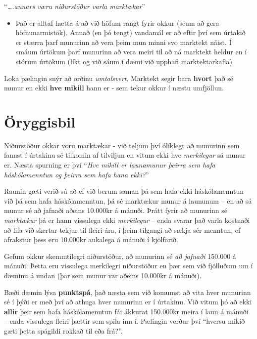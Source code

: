 \documentclass[
]{book}
\providecommand{\tightlist}{%
  \setlength{\itemsep}{0pt}\setlength{\parskip}{0pt}}
\begin{document}
``\emph{\ldots.annars væru niðurstöður varla marktækar}''

\begin{itemize}
\tightlist
\item
  Það er alltaf hætta á að við höfum rangt fyrir okkur (séum að gera höfnunarmistök). Annað (en þó tengt) vandamál er að eftir því sem úrtakið er stærra þarf munurinn að vera þeim mun minni svo marktekt náist. Í smáum úrtökum þarf munurinn að vera meiri til að ná marktekt heldur en í stórum úrtökum (líkt og við sáum í dæmi við upphafi marktektarkafla)
\end{itemize}

Loka pælingin snýr að orðinu \emph{umtalsvert}. Marktekt segir bara \textbf{hvort} það sé munur en ekki \textbf{hve mikill} hann er - sem tekur okkur í næstu umfjöllun.

\hypertarget{uxf6ryggisbil}{%
\chapter{Öryggisbil}\label{uxf6ryggisbil}}

Niðurstöður okkar voru marktækar - við teljum því ólíklegt að munurinn sem fannst í úrtakinu sé tilkomin af tilviljun en vitum ekki hve \emph{merkilegur} sá munur er. Næsta spurning er því ``\emph{Hve mikill er launamunur þeirra sem hafa háskólamenntun og þeirra sem hafa hana ekki?}''

Raunin gæti verið sú að ef við berum saman þá sem hafa ekki háskólamenntun við þá sem hafa háskólamenntun, þá sé marktækur munur á laununum -- en að sá munur sé að jafnaði aðeins 10.000kr á mánuði. Þrátt fyrir að munurinn sé \emph{marktækur} þá er hann vissulega ekki \emph{merkilegur} -- enda svarar það varla kostnaði að lifa við skertar tekjur til fleiri ára, í þeim tilgangi að sækja sér menntun, ef afrakstur þess eru 10.000kr aukalega á mánuði í kjölfarið.

Gefum okkur skemmtilegri niðurstöður, að munurinn sé \emph{að jafnaði} 150.000 á mánuði. Þetta eru vissulega merkilegri niðurstöður en þær sem við fjölluðum um í dæminu á undan (þar sem munur var aðeins 10.000kr á mánuði).

Bæði dæmin lýsa \textbf{punktspá}, það næsta sem við komumst að vita hver munurinn sé í þýði er með því að athuga hver munurinn er í úrtakinu. Við vitum þó að ekki \textbf{allir} þeir sem hafa háskólamenntun fái ákkurat 150.000kr meira í laun á mánuði -- enda vissulega fleiri þættir sem spila inn í. Pælingin verður því ``hversu mikið gæti þetta spágildi rokkað til eða frá?''.
\end{document}
